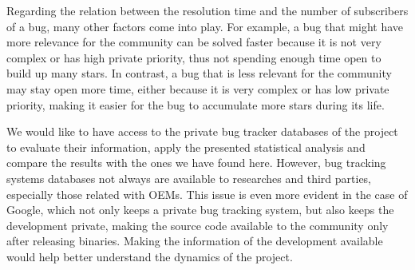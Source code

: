 \documentclass[10pt, conference, compsocconf]{IEEEtran}
\begin{document}
Regarding the relation between the resolution time and the number of subscribers of a bug, many other factors come into play. For example, a bug that might have more relevance for the community can be solved faster because it is not very complex or has high private priority, thus not spending enough time open to build up many stars. In contrast, a bug that is less relevant for the community may stay open more time, either because it is very complex or has low private priority, making it easier for the bug to accumulate more stars during its life.

We would like to have access to the private bug tracker databases of the project to evaluate their information, apply the presented statistical analysis and compare the results with the ones we have found here. However, bug tracking systems databases not always are available to researches and third parties, especially those related with OEMs. This issue is even more evident in the case of Google, which not only keeps a private bug tracking system, but also keeps the development private, making the source code available to the community only after releasing binaries. Making the information of the development available would help better  understand the dynamics of the project.




%
%

\end{document}
